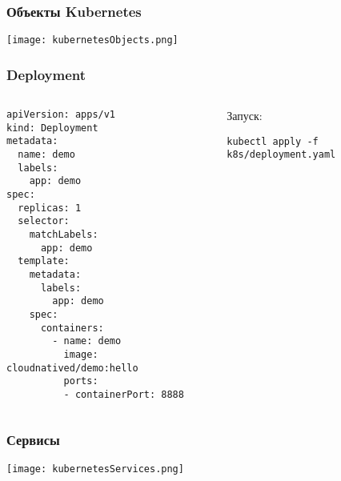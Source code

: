 \documentclass{../../slides-style}
\begin{document}
    \begin{frame}
        \frametitle{Объекты Kubernetes}
        \begin{center}
            \texttt{[image: kubernetesObjects.png]}
        \end{center}
    \end{frame}

    \begin{frame}[fragile]
        \frametitle{Deployment}
        \begin{columns}
            \begin{column}{0.5\textwidth}
                \begin{scriptsize}
                    \begin{verbatim}
apiVersion: apps/v1
kind: Deployment
metadata:
  name: demo
  labels:
    app: demo
spec:
  replicas: 1
  selector:
    matchLabels:
      app: demo
  template:
    metadata:
      labels:
        app: demo
    spec:
      containers:
        - name: demo
          image: cloudnatived/demo:hello
          ports:
          - containerPort: 8888
                    \end{verbatim}
                \end{scriptsize}
            \end{column}
            \begin{column}{0.5\textwidth}
                Запуск:
                \begin{verbatim}
kubectl apply -f k8s/deployment.yaml
                \end{verbatim}
            \end{column}
        \end{columns}
    \end{frame}

    \begin{frame}
        \frametitle{Сервисы}
        \begin{center}
            \texttt{[image: kubernetesServices.png]}
        \end{center}
    \end{frame}
\end{document}
